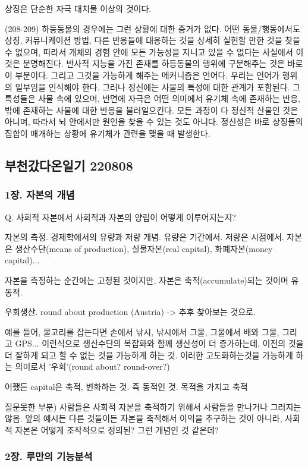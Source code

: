 \documentclass[12pt, a4paper]{article}
\begin{document}
상징은 단순한 자극 대치물 이상의 것이다.

(208-209) 하등동물의 경우에는 그런 상황에 대한 증거가 없다. 어떤 동물/행동에서도 상징, 커뮤니케이션 방법, 다른 반응들에 대응하는 것을 상세히 실현할 만한 것을 찾을 수 없으며, 따라서 개체의 경험 안에 모든 가능성을 지니고 있을 수 없다는 사실에서 이것은 분명해진다. 반사적 지능을 가진 존재를 하등동물의 행위에 구분해주는 것은 바로 이 부분이다. 그리고 그것을 가능하게 해주는 메커니즘은 언어다. 우리는 언어가 행위의 일부임을 인식해야 한다. 그러나 정신에는 사물의 특성에 대한 관계가 포함된다. 그 특성들은 사물 속에 있으며, 반면에 자극은 어떤 의미에서 유기체 속에 존재하는 반응, 밖에 존재하는 사물에 대한 반응을 불러일으킨다. 모든 과정이 다 정신적 산물인 것은 아니며, 따라서 뇌 안에서만 원인을 찾을 수 있는 것도 아니다. 정신성은 바로 상징들의 집합이 매개하는 상황에 유기체가 관련을 맺을 때 발생한다.


\newpage
\subsection{부천갔다온일기 220808}
\subsubsection{1장. 자본의 개념}
Q. 사회적 자본에서 사회적과 자본의 양립이 어떻게 이루어지는지?

자본의 측정.
경제학에서의 유량과 저량 개념. 유량은 기간에서. 저량은 시점에서.
자본은 생산수단(means of production), 실물자본(real capital), 화폐자본(money capital)...

자본을 측정하는 순간에는 고정된 것이지만, 자본은 축적(accumulate)되는 것이며 유동적.

우회생산. round about production (Austria)
-> 추후 찾아보는 것으로.

예를 들어, 물고리를 잡는다면 손에서 낚시, 낚시에서 그물, 그물에서 배와 그물, 그리고 GPS... 이런식으로 생산수단의 복잡화와 함께 생산성이 더 증가하는데, 이전의 것을 더 잘하게 되고 할 수 없는 것을 가능하게 하는 것. 이러한 고도화하는것을 가능하게 하는 의미로서 '우회'(round about? round-over?)

어쨌든 capital은 축적, 변화하는 것. 즉 동적인 것. 목적을 가지고 축적

질문못한 부분) 사람들은 사회적 자본을 축적하기 위해서 사람들을 만나거나 그러지는 않음. 앞의 예시든 다른 것들이든 자본을 축적해서 이익을 추구하는 것이 아니라, 사회적 자본은 어떻게 조작적으로 정의된? 그런 개념인 것 같은데?

\subsubsection{2장. 루만의 기능분석}
\end{document}
